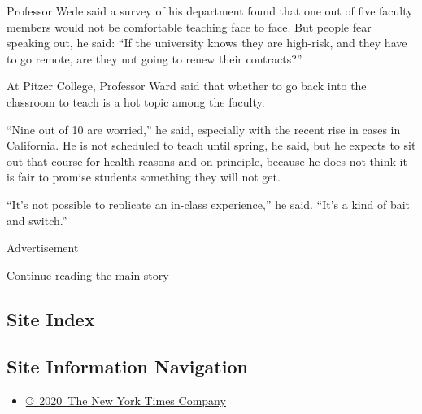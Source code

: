 Professor Wede said a survey of his department found that one out of
five faculty members would not be comfortable teaching face to face. But
people fear speaking out, he said: ``If the university knows they are
high-risk, and they have to go remote, are they not going to renew their
contracts?''

At Pitzer College, Professor Ward said that whether to go back into the
classroom to teach is a hot topic among the faculty.

``Nine out of 10 are worried,'' he said, especially with the recent rise
in cases in California. He is not scheduled to teach until spring, he
said, but he expects to sit out that course for health reasons and on
principle, because he does not think it is fair to promise students
something they will not get.

``It's not possible to replicate an in-class experience,'' he said.
``It's a kind of bait and switch.''

Advertisement

\protect\hyperlink{after-bottom}{Continue reading the main story}

\hypertarget{site-index}{%
\subsection{Site Index}\label{site-index}}

\hypertarget{site-information-navigation}{%
\subsection{Site Information
Navigation}\label{site-information-navigation}}

\begin{itemize}
\tightlist
\item
  \href{https://help.nytimes.com/hc/en-us/articles/115014792127-Copyright-notice}{©~2020~The
  New York Times Company}
\end{itemize}

